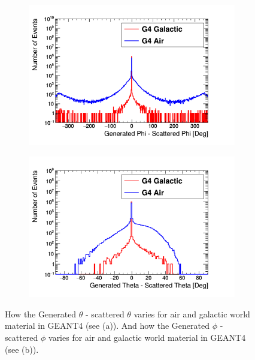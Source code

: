 \begin{figure}[!h]
\centering
\begin{subfigure}{.5\textwidth}
  \centering
  \includegraphics[width=\linewidth]{Chapter4/Figs/Raster/CryPlots/genPhi-scatPhi.png}
  \captionsetup{width=.9\linewidth}
  \caption{}
  \label{subFig:genPhi-scatPhi}
\end{subfigure}%
\begin{subfigure}{.5\textwidth}
  \centering
  \includegraphics[width=\linewidth]{Chapter4/Figs/Raster/CryPlots/genTheta-scatTheta.png}
  \captionsetup{width=.9\linewidth}
  \caption{}
  \label{subFig:genTheta-scatPhi}
\end{subfigure}
\caption{How the Generated $\theta$ - scattered $\theta$ varies for air and galactic world material in GEANT4 (see (a)). And how the Generated $\phi$ - scattered $\phi$ varies for air and galactic world material in GEANT4 (see (b)).}
\label{fig:gen-scat_PhiTheta}
\end{figure}


